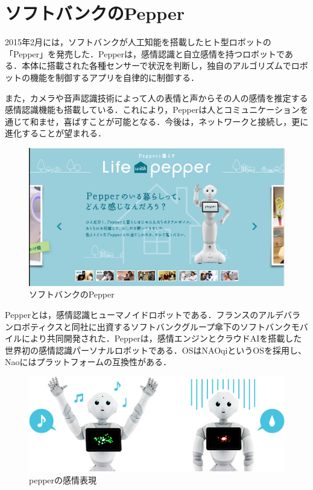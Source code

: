 \clearpage

\section{ソフトバンクのPepper}

2015年2月には，ソフトバンクが人工知能を搭載したヒト型ロボットの「Pepper」を発売した．Pepperは，感情認識と自立感情を持つロボットである．本体に搭載された各種センサーで状況を判断し，独自のアルゴリズムでロボットの機能を制御するアプリを自律的に制御する．




また，カメラや音声認識技術によって人の表情と声からその人の感情を推定する感情認識機能も搭載している．これにより，Pepperは人とコミュニケーションを通じて和ませ，喜ばすことが可能となる．今後は，ネットワークと接続し，更に進化することが望まれる\cite{softbank}．

\begin{figure}[h]
\centering
\includegraphics[width=15cm]{pepper.png}
\caption{ソフトバンクのPepper}\label{図}
\end{figure}

Pepperとは，感情認識ヒューマノイドロボットである．フランスのアルデバランロボティクスと同社に出資するソフトバンクグループ傘下のソフトバンクモバイルにより共同開発された．Pepperは，感情エンジンとクラウドAIを搭載した世界初の感情認識パーソナルロボットである．OSはNAOqiというOSを採用し、Naoにはプラットフォームの互換性がある．

\begin{figure}[h]
\centering
\includegraphics[width=15cm]{figemotion2.jpg}
\caption{pepperの感情表現}\label{図}
\end{figure}

